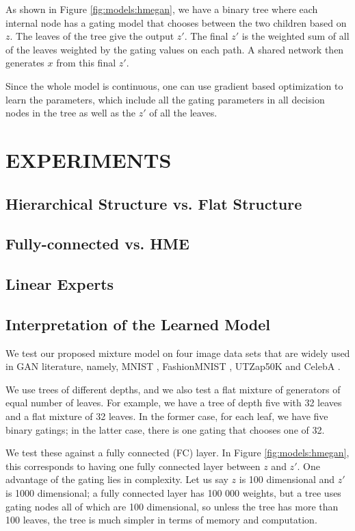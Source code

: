 \documentclass[a4paper,onesided,12pt]{report}
\begin{document}
As shown in Figure \ref{fig:models:hmegan}, we have a binary tree where each internal node has a gating model that chooses between the two children based on $z$. The leaves of the tree give the output $z'$. The final $z'$ is the weighted sum of all of the leaves weighted by the gating values on each path. A shared network then generates $x$ from this final $z'$. 

Since the whole model is continuous, one can use gradient based optimization to learn the parameters, which include all the gating parameters in all decision nodes in the tree as well as the $z'$ of all the leaves.

\chapter{EXPERIMENTS}
\label{chapter:exps}

\section{Hierarchical Structure vs. Flat Structure}
\label{sec:hme-vs-me}

\section{Fully-connected vs. HME}
\label{sec:fc-vs-hme}

\section{Linear Experts}
\label{sec:hme-linear}

\section{Interpretation of the Learned Model}
\label{sec:interpret}

We test our proposed mixture model on four image data sets that are widely used in GAN literature, namely, MNIST \cite{mnist}, FashionMNIST \cite{fashion}, UTZap50K \cite{utzap50k} and CelebA \cite{celeba}. 

We use trees of different depths, and we also test a flat mixture of generators of equal number of leaves. For example, we have a tree of depth five with 32 leaves and a flat mixture of 32 leaves. In the former case, for each leaf, we have five binary gatings; in the latter case, there is one gating that chooses one of 32. 

We test these against a fully connected (FC) layer. In Figure \ref{fig:models:hmegan}, this corresponds to having one fully connected layer between $z$ and $z'$. One advantage of the gating lies in complexity. Let us say $z$ is 100 dimensional and $z'$ is 1000 dimensional; a fully connected layer has 100 000 weights, but a tree uses gating nodes all of which are 100 dimensional, so unless the tree has more than 100 leaves, the tree is much simpler in terms of memory and computation.
\end{document}
